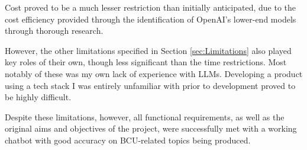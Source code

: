 \para Cost proved to be a much lesser restriction than initially anticipated, due to the cost efficiency 
provided through the identification of OpenAI's lower-end models through thorough research. 

\para However, the other limitations specified in Section \ref{sec:Limitations} also played key roles of their own, though less significant 
than the time restrictions. Most notably of these was my own lack of experience with LLMs. Developing a product using a tech stack 
I was entirely unfamiliar with prior to development proved to be highly difficult.

\para Despite these limitations, however, all functional 
requirements, as well as the original aims and objectives of the project, were successfully met with a working chatbot with 
good accuracy on BCU-related topics being produced.